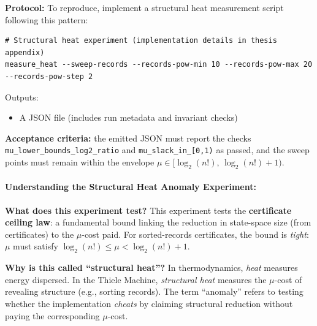 \textbf{Protocol:}
To reproduce, implement a structural heat measurement script following this pattern:
\begin{lstlisting}
# Structural heat experiment (implementation details in thesis appendix)
measure_heat --sweep-records --records-pow-min 10 --records-pow-max 20 --records-pow-step 2
\end{lstlisting}
Outputs:
\begin{itemize}
    \item A JSON file (includes run metadata and invariant checks)
\end{itemize}

\textbf{Acceptance criteria:} the emitted JSON must report the checks \texttt{mu\_lower\_bounds\_log2\_ratio} and \texttt{mu\_slack\_in\_[0,1)} as passed, and the sweep points must remain within the envelope $\mu \in [\log_2(n!),\,\log_2(n!)+1)$.

\paragraph{Understanding the Structural Heat Anomaly Experiment:}

\textbf{What does this experiment test?} This experiment tests the \textbf{certificate ceiling law}: a fundamental bound linking the reduction in state-space size (from certificates) to the $\mu$-cost paid. For sorted-records certificates, the bound is \textit{tight}: $\mu$ must satisfy $\log_2(n!) \leq \mu < \log_2(n!) + 1$.

\textbf{Why is this called ``structural heat''?} In thermodynamics, \textit{heat} measures energy dispersed. In the Thiele Machine, \textit{structural heat} measures the $\mu$-cost of revealing structure (e.g., sorting records). The term ``anomaly'' refers to testing whether the implementation \textit{cheats} by claiming structural reduction without paying the corresponding $\mu$-cost.

